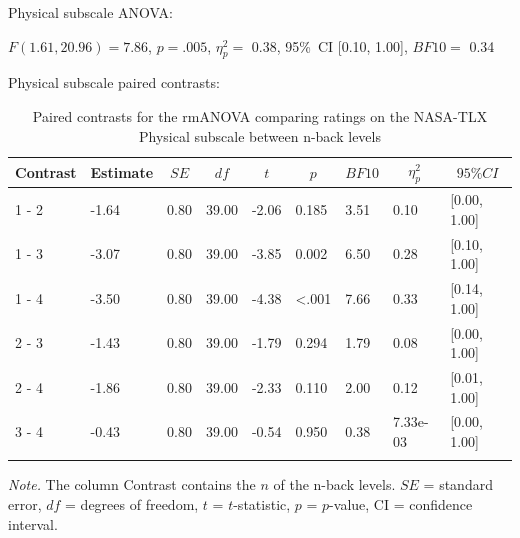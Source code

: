 \documentclass[
  man,floatsintext]{apa6}
\begin{document}
\newpage

Physical subscale ANOVA:

\(F(1.61, 20.96) = 7.86\), \(p = .005\), \(\eta_{p}^{2}=\) 0.38, 95\%~CI {[}0.10, 1.00{]}, \(BF10=\) 0.34

Physical subscale paired contrasts:

\begin{table}[H]

\begin{center}
\begin{threeparttable}

\caption{\label{tab:unnamed-chunk-3}Paired contrasts for the rmANOVA comparing ratings on the NASA-TLX Physical subscale between n-back levels}

\begin{tabular}{lllllllll}
\toprule
Contrast & \multicolumn{1}{c}{Estimate} & \multicolumn{1}{c}{$SE$} & \multicolumn{1}{c}{$df$} & \multicolumn{1}{c}{$t$} & \multicolumn{1}{c}{$p$} & \multicolumn{1}{c}{$BF10$} & \multicolumn{1}{c}{$\eta_{p}^{2}$} & \multicolumn{1}{c}{$95\% CI$}\\
\midrule
1 - 2 & -1.64 & 0.80 & 39.00 & -2.06 & 0.185 & 3.51 & 0.10 & {}[0.00, 1.00]\\
1 - 3 & -3.07 & 0.80 & 39.00 & -3.85 & 0.002 & 6.50 & 0.28 & {}[0.10, 1.00]\\
1 - 4 & -3.50 & 0.80 & 39.00 & -4.38 & <.001 & 7.66 & 0.33 & {}[0.14, 1.00]\\
2 - 3 & -1.43 & 0.80 & 39.00 & -1.79 & 0.294 & 1.79 & 0.08 & {}[0.00, 1.00]\\
2 - 4 & -1.86 & 0.80 & 39.00 & -2.33 & 0.110 & 2.00 & 0.12 & {}[0.01, 1.00]\\
3 - 4 & -0.43 & 0.80 & 39.00 & -0.54 & 0.950 & 0.38 & 7.33e-03 & {}[0.00, 1.00]\\
\bottomrule
\addlinespace
\end{tabular}

\begin{tablenotes}[para]
\normalsize{\textit{Note.} The column Contrast contains the $n$ of the n-back levels. $SE$ = standard error, $df$ = degrees of freedom, $t$ = $t$-statistic, $p$ = $p$-value, CI = confidence interval.}
\end{tablenotes}

\end{threeparttable}
\end{center}

\end{table}

\newpage
\end{document}
